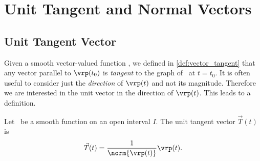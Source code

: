 \section{Unit Tangent and Normal Vectors}\label{sec:tan_norm}

\subsection{Unit Tangent Vector}

Given a smooth vector-valued function \vrt, we defined in \autoref{def:vector_tangent} that any vector parallel to $\vrp(t_0)$ is \emph{tangent} to the graph of \vrt\ at $t=t_0$. It is often useful to consider just the \emph{direction} of $\vrp(t)$ and not its magnitude. Therefore we are interested in the unit vector in the direction of $\vrp(t)$. This leads to a definition.

\begin{definition}\label{def:unit_tangent}%
Let \vrt\ be a smooth function on an open interval $I$. The unit tangent vector $\vec T(t)$ is
 
\[\vec T(t) = \frac1{\norm{\vrp(t)}}\vrp(t).\]
\end{definition}


